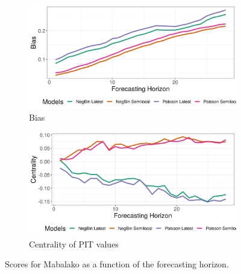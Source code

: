 \begin{figure}[H]
\begin{subfigure}{0.5\textwidth}
  \centering
  \includegraphics[width=\linewidth]{../output/Mabalako_bias.png}  
  \caption{Bias}
  \label{fig:Mabalako_scores_3}
\end{subfigure}
\begin{subfigure}{0.5\textwidth}
  \centering
  \includegraphics[width=\linewidth]{../output/Mabalako_centrality.png}  
  \caption{Centrality of PIT values}
  \label{fig:Mabalako_scores_4}
\end{subfigure}
  \caption{Scores for Mabalako as a function of the forecasting horizon.}

  \label{fig:nat_scores}
\end{figure}
